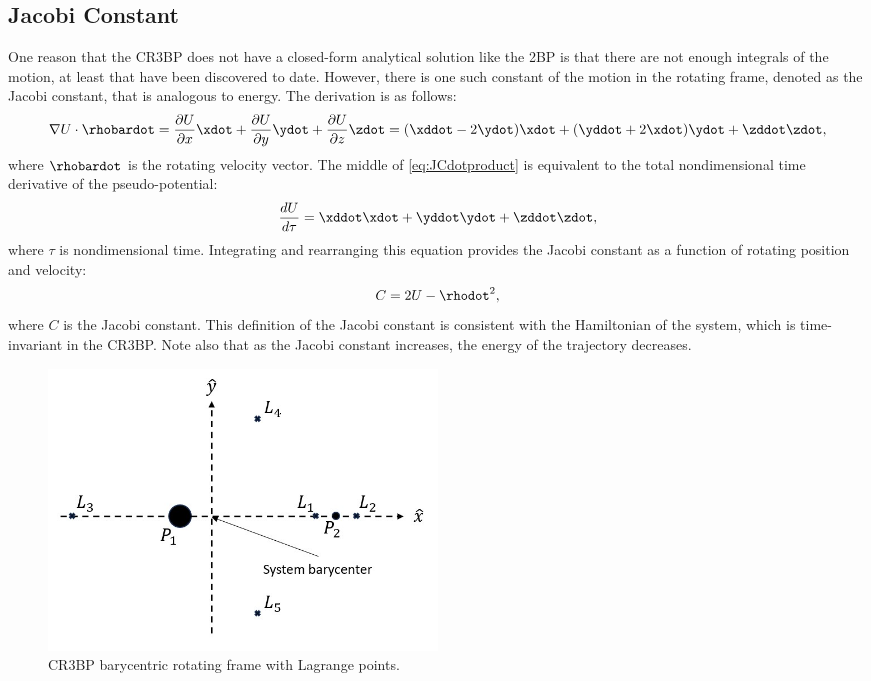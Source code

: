\subsection{Jacobi Constant}
One reason that the CR3BP does not have a closed-form analytical solution like the 2BP is that
there are not enough integrals of the motion, at least that have been discovered to date. However,
there is one such constant of the motion in the rotating frame, denoted as the Jacobi constant,
that is analogous to energy. The derivation is as follows\cite{Zimovan:2017}:
\begin{equation}
    \nabla U\cdot\rhobardot=\frac{\partial U}{\partial x}\xdot+\frac{\partial U}{\partial y}\ydot+\frac{\partial U}{\partial z}\zdot=(\xddot-2\ydot)\xdot+(\yddot+2\xdot)\ydot+\zddot\zdot,
    \label{eq:JCdotproduct}
\end{equation}
where $\rhobardot$ is the rotating velocity vector. The middle of \cref{eq:JCdotproduct} is
equivalent to the total nondimensional time derivative of the pseudo-potential:
\begin{equation}
    \frac{dU}{d\tau}=\xddot\xdot+\yddot\ydot+\zddot\zdot,
    \label{eq:JCtimeder}
\end{equation}
where $\tau$ is nondimensional time. Integrating and rearranging this equation provides the Jacobi
constant as a function of rotating position and velocity:
\begin{equation}
    C=2U-\rhodot^{2},
    \label{eq:JC}
\end{equation}
where $C$ is the Jacobi constant. This definition of the Jacobi constant is consistent with the
Hamiltonian of the system, which is time-invariant in the CR3BP\cite{Boudad:2022}. Note also that
as the Jacobi constant increases, the energy of the trajectory decreases.

\begin{figure}[H]
    \centering
    \includegraphics[width=0.5\textwidth]{figures/RotFrame.jpg}
    \caption{CR3BP barycentric rotating frame with Lagrange points.}
    \label{fig:rotFrame}
\end{figure}
